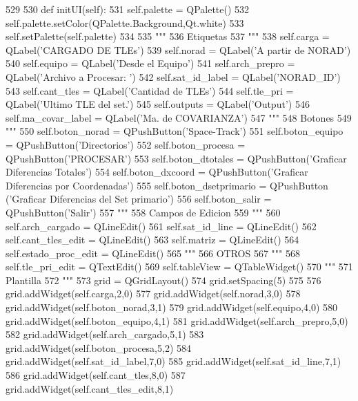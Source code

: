 \begin{DoxyCode}
529 
530     def initUI(self):
531         self.palette = QPalette()
532         self.palette.setColor(QPalette.Background,Qt.white)
533         self.setPalette(self.palette)
534         
535         """
536         Etiquetas
537         """
538         self.carga           = QLabel('CARGADO DE TLEs')
539         self.norad           = QLabel('A partir de NORAD')  
540         self.equipo          = QLabel('Desde el Equipo')
541         self.arch_prepro     = QLabel('Archivo a Procesar: ')
542         self.sat_id_label    = QLabel('NORAD_ID')
543         self.cant_tles       = QLabel('Cantidad de TLEs')
544         self.tle_pri         = QLabel('Ultimo TLE del set.')
545         self.outputs         = QLabel('Output')
546         self.ma_covar_label  = QLabel('Ma. de COVARIANZA')
547         """
548         Botones
549         """
550         self.boton_norad        = QPushButton('Space-Track')
551         self.boton_equipo       = QPushButton('Directorios')
552         self.boton_procesa      = QPushButton('PROCESAR')
553         self.boton_dtotales     = QPushButton('Graficar Diferencias Totales')
554         self.boton_dxcoord      = QPushButton('Graficar Diferencias por
       Coordenadas')
555         self.boton_dsetprimario = QPushButton ('Graficar Diferencias del Set
       primario')
556         self.boton_salir        = QPushButton('Salir')
557         """
558         Campos de Edicion
559         """
560         self.arch_cargado       = QLineEdit()
561         self.sat_id_line        = QLineEdit()
562         self.cant_tles_edit     = QLineEdit()
563         self.matriz             = QLineEdit()
564         self.estado_proc_edit   = QLineEdit()
565         """
566         OTROS
567         """
568         self.tle_pri_edit    = QTextEdit()
569         self.tableView       = QTableWidget()
570         """
571         Plantilla
572         """
573         grid = QGridLayout()
574         grid.setSpacing(5)
575         
576         grid.addWidget(self.carga,2,0)
577         grid.addWidget(self.norad,3,0)
578         grid.addWidget(self.boton_norad,3,1)
579         grid.addWidget(self.equipo,4,0)
580         grid.addWidget(self.boton_equipo,4,1)
581         grid.addWidget(self.arch_prepro,5,0)
582         grid.addWidget(self.arch_cargado,5,1)
583         grid.addWidget(self.boton_procesa,5,2)
584         grid.addWidget(self.sat_id_label,7,0)
585         grid.addWidget(self.sat_id_line,7,1)
586         grid.addWidget(self.cant_tles,8,0)
587         grid.addWidget(self.cant_tles_edit,8,1)        

\end{DoxyCode}
